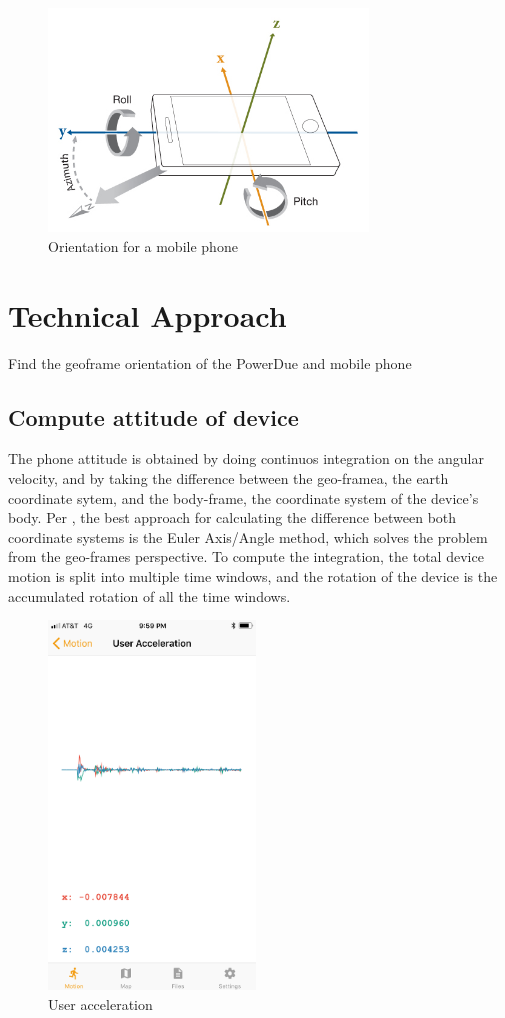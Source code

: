 \documentclass[journal]{IEEEtranTIE}
\begin{document}
\begin{figure}[!t]\centering
	\includegraphics[width=8.5cm]{phoneOrientation}
	\caption{Orientation for a mobile phone}\label{fig1}
\end{figure}


\section{Technical Approach}

Find the geoframe orientation of the PowerDue and mobile phone

\subsection{Compute attitude of device}

The phone attitude is obtained by doing continuos integration on the angular
velocity, and by taking the difference between the geo-framea, the earth
coordinate sytem, and the body-frame, the coordinate system of the device's
body. Per \cite{PhoneAttitude}, the best approach for calculating the difference
between both coordinate systems is the Euler Axis/Angle method, which solves the
problem from the geo-frames perspective. To compute the integration, the total
device motion is split into multiple time windows, and the rotation of the
device is the accumulated rotation of all the time windows.

\begin{figure}[!t]\centering
	\includegraphics[width=5.5cm]{acceleration}
	\caption{User acceleration}\label{fig2}
\end{figure}
\end{document}
